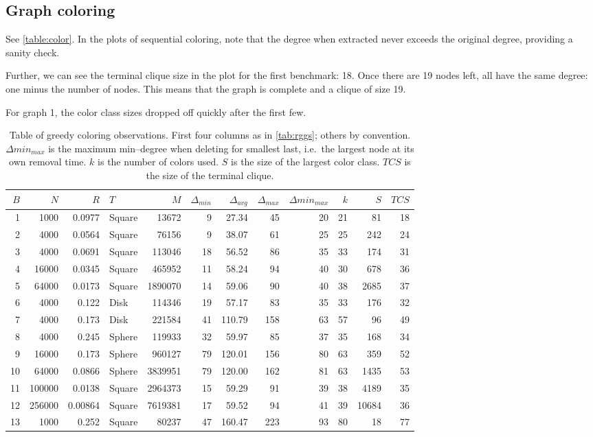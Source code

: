 \documentclass[oneside, titlepage]{scrartcl}
\begin{document}
\subsection{Graph coloring}
See \autoref{table:color}. In the plots of sequential coloring, note that the degree when extracted never exceeds the original degree, providing a sanity check.

Further, we can see the terminal clique size in the plot for the first benchmark: 18. Once there are 19 nodes left, all have the same degree: one minus the number of nodes. This means that the graph is complete and a clique of size 19.

For graph 1, the color class sizes dropped off quickly after the first few. 

\begin{table}[h]
\small
\centering
\begin{tabular}{r r r l | r r r r r r r r}
$B$ & $N$ & $R$ & $T$ & $M$ & $\Delta_{min}$& $\Delta_{avg}$ & $\Delta_{max}$ & $\Delta min_{max}$ & $k$ & $S$ & $TCS$\\
\hline 
1 & 1000 & 0.0977 & Square & 13672 & 9 & 27.34 & 45 & 20 & 21 & 81 & 18 \\
2 & 4000 & 0.0564 & Square & 76156 & 9 & 38.07 & 61 & 25 & 25 & 242 & 24\\
3 & 4000 & 0.0691 & Square & 113046 & 18 & 56.52 & 86 & 35 & 33 & 174 & 31\\
4 & 16000 & 0.0345 & Square & 465952 & 11 & 58.24 & 94 & 40 & 30 & 678 & 36\\
5 & 64000 & 0.0173 & Square & 1890070 & 14 & 59.06 & 90 & 40 & 38 & 2685 & 37\\
6 & 4000 & 0.122 & Disk & 114346 & 19 & 57.17 & 83 & 35 & 33 & 176 & 32\\
7 & 4000 & 0.173 & Disk & 221584 & 41 & 110.79 & 158 & 63 & 57 & 96 & 49\\
8 & 4000 & 0.245 & Sphere & 119933 & 32 & 59.97 & 85 & 37 & 35 & 168 & 34\\
9 & 16000 & 0.173 & Sphere & 960127 & 79 & 120.01 & 156 & 80 & 63 & 359 & 52\\
10 & 64000 & 0.0866 & Sphere & 3839951 & 79 & 120.00 & 162 & 81 & 63 & 1435 & 53\\
11 & 100000 & 0.0138 & Square & 2964373 & 15 & 59.29 & 91 & 39 & 38 & 4189 & 35\\
12 & 256000 & 0.00864 & Square & 7619381 & 17 & 59.52 & 94 & 41 & 39 & 10684 & 36\\
13 & 1000 & 0.252 & Square & 80237 & 47 & 160.47 & 223 & 93 & 80 & 18 & 77\\
\end{tabular}
\caption{Table of greedy coloring observations. First four columns as in \autoref{tab:rggs}; others by convention. $\Delta min_{max}$ is the maximum min--degree when deleting for smallest last, i.e.\ the largest node at its own removal time. $k$ is the number of colors used. $S$ is the size of the largest color class. $TCS$ is the size of the terminal clique.}
\label{table:color}
\end{table}
\end{document}
